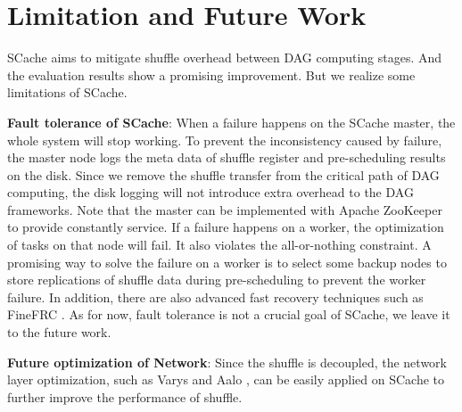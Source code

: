 \section{Limitation and Future Work}
SCache aims to mitigate shuffle overhead between DAG computing stages. And the evaluation results show a promising improvement. But we realize some limitations of SCache.

\textbf{Fault tolerance of SCache}: When a failure happens on the SCache master, the whole system will stop working. To prevent the inconsistency caused by failure, the master node logs the meta data of shuffle register and pre-scheduling results on the disk. Since we remove the shuffle transfer from the critical path of DAG computing, the disk logging will not introduce extra overhead to the DAG frameworks. Note that the master can be implemented with Apache ZooKeeper \cite{zookeeper} to provide constantly service. If a failure happens on a worker, the optimization of tasks on that node will fail. It also violates the all-or-nothing constraint. A promising way to solve the failure on a worker is to select some backup nodes to store replications of shuffle data during pre-scheduling to prevent the worker failure. In addition, there are also advanced fast recovery techniques such as FineFRC \cite{finefrc}. As for now, fault tolerance is not a crucial goal of SCache,  we leave it to the future work.


\textbf{Future optimization of Network}: Since the shuffle is decoupled, the network layer optimization, such as Varys \cite{varys} and Aalo \cite{aalo}, can be easily applied on SCache to further improve the performance of shuffle.